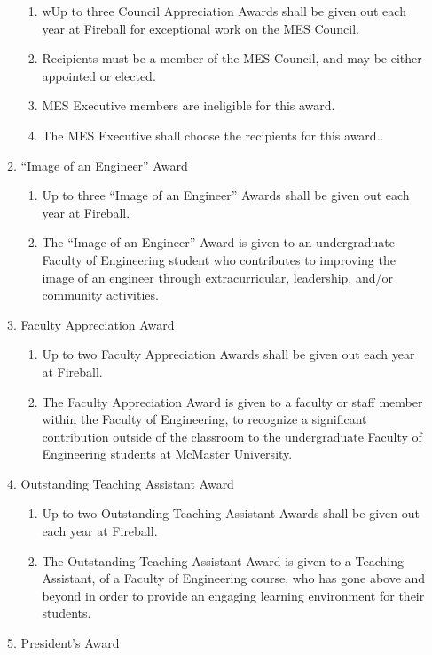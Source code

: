 \begin{enumerate}
\begin{enumerate}
  \begin{enumerate}
   \item
    wUp to three Council Appreciation Awards shall be given out each
    year at Fireball for exceptional work on the MES Council.
   \item
    Recipients must be a member of the MES Council, and may be either
    appointed or elected.
   \item
    MES Executive members are ineligible for this award.
   \item
    The MES Executive shall choose the recipients for this award..
  \end{enumerate}
 \item
  ``Image of an Engineer'' Award

  \begin{enumerate}
   \item
    Up to three ``Image of an Engineer'' Awards shall be given out each
    year at Fireball.
   \item
    The ``Image of an Engineer'' Award is given to an undergraduate
    Faculty of Engineering student who contributes to improving the
    image of an engineer through extracurricular, leadership, and/or
    community activities.
  \end{enumerate}
 \item
  Faculty Appreciation Award

  \begin{enumerate}
   \item
    Up to two Faculty Appreciation Awards shall be given out each year
    at Fireball.
   \item
    The Faculty Appreciation Award is given to a faculty or staff member
    within the Faculty of Engineering, to recognize a significant
    contribution outside of the classroom to the undergraduate Faculty
    of Engineering students at McMaster University.
  \end{enumerate}
 \item
  Outstanding Teaching Assistant Award

  \begin{enumerate}
   \item
    Up to two Outstanding Teaching Assistant Awards shall be given out
    each year at Fireball.
   \item
    The Outstanding Teaching Assistant Award is given to a Teaching
    Assistant, of a Faculty of Engineering course, who has gone above
    and beyond in order to provide an engaging learning environment for
    their students.
  \end{enumerate}
 \item
  President's Award


\end{enumerate}
\end{enumerate}
